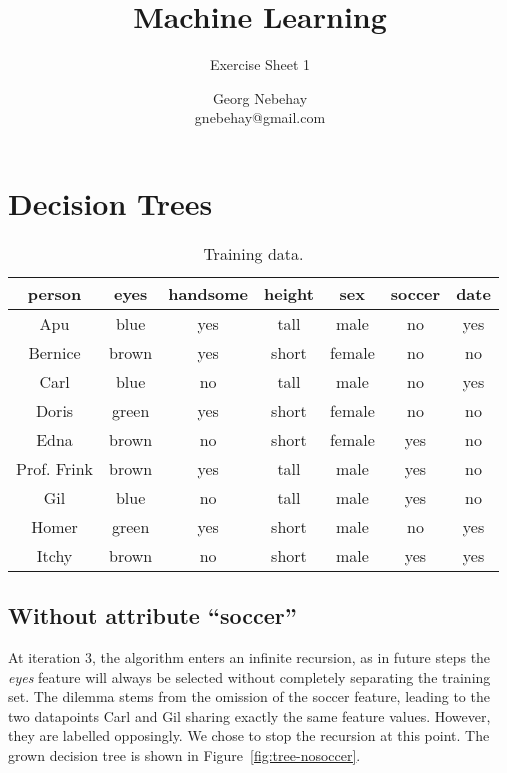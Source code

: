\documentclass{scrartcl}
\title{Machine Learning}
\subtitle{Exercise Sheet 1}
\author{Georg Nebehay\\gnebehay@gmail.com}
\date{}
\begin{document}
\maketitle

\section{Decision Trees}

\begin{table}[h!]
  \centering
  \begin{tabular}{cccccc|c}
    \toprule
    person      & eyes  & handsome & height & sex    & soccer & date\\
    \midrule
    Apu         & blue  & yes      & tall   & male   & no     & yes \\
    Bernice     & brown & yes      & short  & female & no     & no  \\
    Carl        & blue  & no       & tall   & male   & no     & yes \\
    Doris       & green & yes      & short  & female & no     & no  \\
    Edna        & brown & no       & short  & female & yes    & no  \\
    Prof. Frink & brown & yes      & tall   & male   & yes    & no  \\
    Gil         & blue  & no       & tall   & male   & yes    & no  \\
    Homer       & green & yes      & short  & male   & no     & yes \\
    Itchy       & brown & no       & short  & male   & yes    & yes \\
    \bottomrule
  \end{tabular}
  \caption{Training data.}
\end{table}

\subsection{Without attribute ``soccer''}

At iteration 3, the algorithm enters an infinite recursion,
as in future steps the \textit{eyes} feature will always be selected
without completely separating the training set.
The dilemma stems from the omission of the soccer feature,
leading to the two datapoints Carl and Gil sharing exactly the same feature values.
However, they are labelled opposingly.
We chose to stop the recursion at this point.
The grown decision tree is shown in Figure~\ref{fig:tree-nosoccer}.
\end{document}
